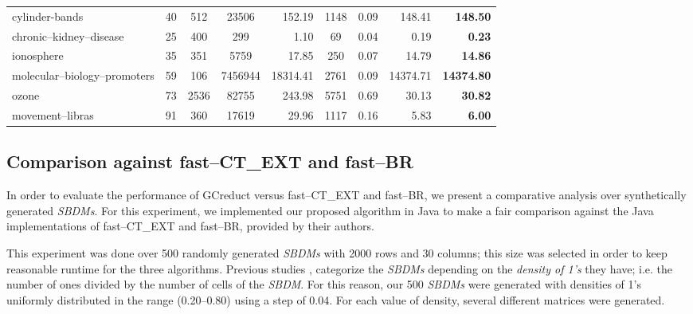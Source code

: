 \documentclass[authoryear,preprint,review,12pt]{elsarticle}
\begin{document}
\begin{table}[!htb]
\begin{tabular}{|l|c|c|c|r|c|c|r|r|}
			cylinder-bands & 40 & 512 & 23506 & 152.19 & 1148 & 0.09 & 148.41 & \textbf{148.50}\\ %
			chronic--kidney--disease & 25 & 400 & 299 & 1.10 & 69 & 0.04 & 0.19 & \textbf{0.23} \\ %
			ionosphere & 35 & 351 & 5759 & 17.85 & 250 & 0.07 & 14.79 & \textbf{14.86}\\ %
			molecular--biology--promoters & 59 & 106 & 7456944 & 18314.41 & 2761 & 0.09 & 14374.71 & \textbf{14374.80} \\ %
			ozone & 73 & 2536 & 82755 & 243.98 & 5751 & 0.69 & 30.13 & \textbf{30.82} \\ %
			movement--libras & 91 & 360 & 17619 & 29.96 & 1117 & 0.16 & 5.83 & \textbf{6.00} \\ %
				
		\hline
    	\end{tabular}
    \end{table}
    

\subsection{Comparison against fast--CT\_EXT and fast--BR}\label{sub:synth}
	In order to evaluate the performance of GCreduct versus fast--CT\_EXT and fast--BR, we present a comparative analysis over synthetically generated \textit{SBDMs}. For this experiment, we implemented our proposed algorithm in Java to make a fair comparison against the Java implementations of fast--CT\_EXT and fast--BR, provided by their authors. 
	
	This experiment was done over 500 randomly generated \textit{SBDMs} with 2000 rows and 30 columns; this size was selected in order to keep reasonable runtime for the three algorithms. Previous studies \citep{Rojas12,Lias13,Rodriguez15}, categorize the \textit{SBDMs} depending on the \emph{density of 1's} they have; i.e. the number of ones divided by the number of cells of the \textit{SBDM}. For this reason, our 500 \textit{SBDMs} were generated with densities of 1's uniformly distributed in the range (0.20--0.80) using a step of 0.04. 
	For each value of density, several different matrices were generated. 
				
\end{document}

